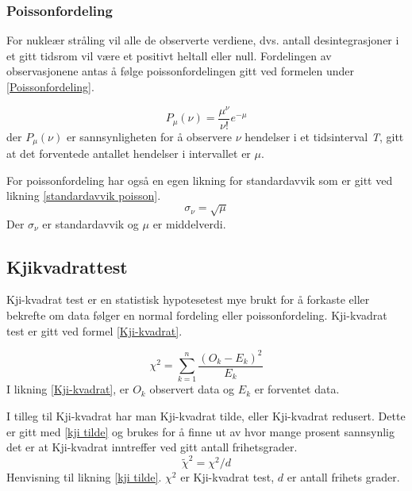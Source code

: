 \documentclass[twocolumn, 11pt]{article} %
\begin{document}
    \subsubsection{Poissonfordeling}
    For nukleær stråling vil alle de observerte verdiene, dvs. antall desintegrasjoner i et gitt tidsrom vil være et positivt heltall eller null. Fordelingen av observasjonene antas å følge poissonfordelingen gitt ved formelen under \eqref{Poissonfordeling}.

    \begin{equation}
        P_\mu(\nu) = \frac{\mu^\nu}{\nu!} e^{-\mu}
    \label{Poissonfordeling}
    \end{equation}
    der \textit{$P_\mu(\nu)$} er sannsynligheten for å observere \textit{$\nu$} hendelser i et tidsinterval \textit{T}, gitt at det forventede antallet hendelser i intervallet er \textit{$\mu$}.

    For poissonfordeling har også en egen likning for standardavvik som er gitt ved likning \eqref{standardavvik poisson}.
    \begin{equation}
	\sigma_{\nu} = \sqrt{\mu}
    \label{standardavvik poisson}
    \end{equation}
    Der \textit{$\sigma_{\nu}$} er standardavvik og \textit{$\mu$} er middelverdi\cite{oppgavetekst}.

    \subsection{Kjikvadrattest}
    Kji-kvadrat test er en statistisk hypotesetest mye brukt for å forkaste eller bekrefte om data følger en normal fordeling eller poissonfordeling. Kji-kvadrat test er gitt ved formel \eqref{Kji-kvadrat}.

    \begin{equation}
	\chi^2  = \sum_{k=1}^n \frac{(O_k -E_k)^2}{E_k}
    \label{Kji-kvadrat}
    \end{equation}
    I likning \eqref{Kji-kvadrat}, er \textit{$O_k$} observert data og \textit{$E_k$} er forventet data.

    I tilleg til Kji-kvadrat har man Kji-kvadrat tilde, eller Kji-kvadrat redusert. Dette er gitt med \eqref{kji tilde} og brukes for å finne ut av hvor mange prosent sannsynlig det er at Kji-kvadrat inntreffer ved gitt antall frihetsgrader.
    \begin{equation}
	\tilde\chi^2 = \chi^2 / \textit{d}
    \label{kji tilde}
    \end{equation}
    Henvisning til likning \eqref{kji tilde}. \textit{$\chi^2$} er Kji-kvadrat test, \textit{$d$} er antall frihets grader.
\end{document}
